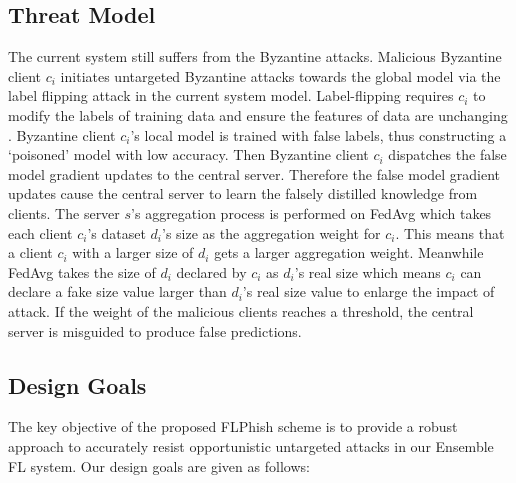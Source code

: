 \documentclass[journal]{IEEEtran}
\begin{document}
\subsection{Threat Model}
The current system still suffers from the Byzantine attacks. Malicious Byzantine client $c_{i}$ initiates untargeted Byzantine attacks towards the global model via the label flipping attack in the current system model. Label-flipping requires $c_{i}$ to modify the labels of training data and ensure the features of data are unchanging \cite{ref_18_label_flipping}. Byzantine client $c_{i}$'s local model is trained with false labels, thus constructing a `poisoned' model with low accuracy. Then Byzantine client $c_{i}$ dispatches the false model gradient updates to the central server. Therefore the false model gradient updates cause the central server to learn the falsely distilled knowledge from clients. The server $s$'s aggregation process is performed on FedAvg which takes each client $c_{i}$'s dataset $d_{i}$'s size as the aggregation weight for $c_{i}$. This means that a client $c_{i}$ with a larger size of $d_{i}$ gets a larger aggregation weight. Meanwhile FedAvg takes the size of $d_{i}$ declared by $c_{i}$ as $d_{i}$'s real size which means $c_{i}$ can declare a fake size value larger than $d_{i}$'s real size value to enlarge the impact of attack. If the weight of the malicious clients reaches a threshold, the central server is misguided to produce false predictions.


\subsection{Design Goals}
The key objective of the proposed FLPhish scheme is to provide a robust approach to accurately resist opportunistic untargeted attacks in our Ensemble FL system. Our design goals are given as follows:
\end{document}
